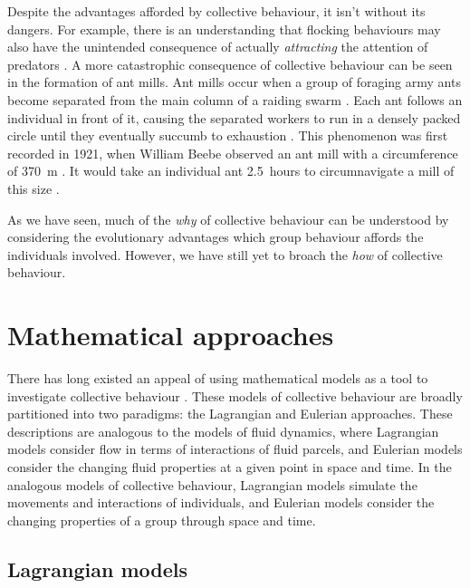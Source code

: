Despite the advantages afforded by collective behaviour, it isn't without its
dangers. For example, there is an understanding that flocking behaviours may
also have the unintended consequence of actually \emph{attracting} the
attention of predators \parencite{wittenberger85}. A more catastrophic
consequence of collective behaviour can be seen in the formation of ant mills.
Ant mills occur when a group of foraging army ants become separated from the
main column of a raiding swarm \parencite{schneirla44}. Each ant follows an
individual in front of it, causing the separated workers to run in a densely
packed circle until they eventually succumb to exhaustion
\parencite{schneirla71}. This phenomenon was first recorded in 1921, when
William Beebe observed an ant mill with a circumference of \SI{370}{\metre}
\parencite{beebe21}. It would take an individual ant \SI{2.5}{hours} to
circumnavigate a mill of this size \parencite{surowiecki05}.

As we have seen, much of the \emph{why} of collective behaviour can be
understood by considering the evolutionary advantages which group behaviour
affords the individuals involved. However, we have still yet to broach the
\emph{how} of collective behaviour.

\section{Mathematical approaches}
\label{sec:models}

There has long existed an appeal of using mathematical models as a tool to
investigate collective behaviour \parencite{aoki82, okubo86, reynolds87,
huth92, gueron93, vicsek95, couzin02}. These models of collective behaviour are
broadly partitioned into two paradigms: the Lagrangian and Eulerian approaches.
These descriptions are analogous to the models of fluid dynamics, where
Lagrangian models consider flow in terms of interactions of fluid parcels, and
Eulerian models consider the changing fluid properties at a given point in
space and time. In the analogous models of collective behaviour, Lagrangian
models simulate the movements and interactions of individuals, and Eulerian
models consider the changing properties of a group through space and time.

\subsection{Lagrangian models}
\label{ssec:lagrangian_models}


